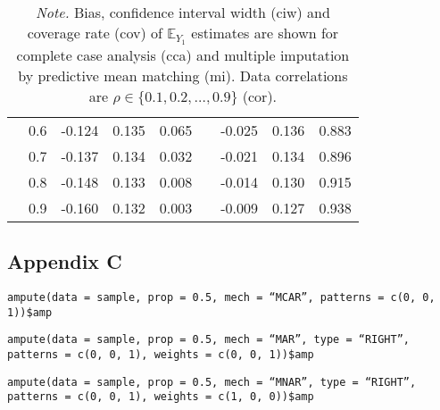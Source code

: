 \documentclass[11pt,a4paper]{article}
\newcommand{\code}[1]{\texttt{#1}}
\begin{document}
\begin{table}[h!]
\begin{tabular}{lrrrrrrrr}
   & 0.6 & -0.124 & 0.135 & 0.065 &  & -0.025 & 0.136 & 0.883 \\ 
   & 0.7 & -0.137 & 0.134 & 0.032 &  & -0.021 & 0.134 & 0.896 \\ 
   & 0.8 & -0.148 & 0.133 & 0.008 &  & -0.014 & 0.130 & 0.915 \\ 
   & 0.9 & -0.160 & 0.132 & 0.003 &  & -0.009 & 0.127 & 0.938 \\ 
   \hline
\end{tabular}
\vspace{2mm}
\caption*{\footnotesize \textit{Note.} Bias, confidence interval width (ciw) and coverage rate (cov) of $\mathbb{E}_{Y_1}$ estimates are shown for complete case analysis (cca) and multiple imputation by predictive mean matching (mi). Data correlations are $\rho \in \{0.1, 0.2, \dots, 0.9\}$ (cor).}
\end{table}

\subsection*{Appendix C}

\code{ampute(data = sample, prop = 0.5, mech = ``MCAR'', patterns = c(0, 0, 1))\$amp}

\vspace{5mm}
\noindent \code{ampute(data = sample, prop = 0.5, mech = ``MAR'', type = ``RIGHT'', patterns = c(0, 0, 1), weights = c(0, 0, 1))\$amp}

\vspace{5mm}
\noindent \code{ampute(data = sample, prop = 0.5, mech = ``MNAR'', type = ``RIGHT'', patterns = c(0, 0, 1), weights = c(1, 0, 0))\$amp}
\end{document}
